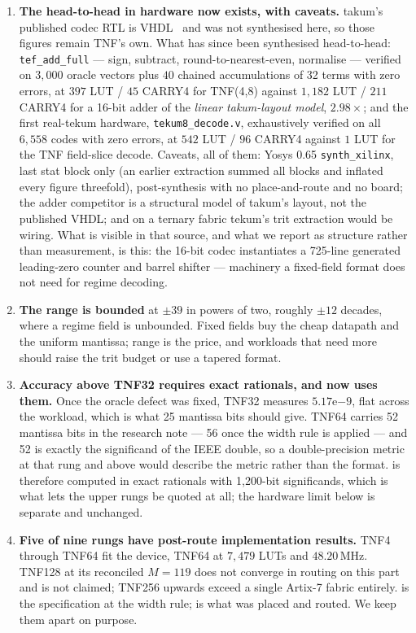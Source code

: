 \begin{enumerate}[leftmargin=*]
\item \textbf{The head-to-head in hardware now exists, with caveats.} takum's
published codec RTL is VHDL~\cite{takumrtl} and was not synthesised here, so
those figures remain TNF's own. What has since been synthesised head-to-head:
\texttt{tef\_add\_full} --- sign, subtract, round-to-nearest-even, normalise
--- verified on $3{,}000$ oracle vectors plus $40$ chained accumulations of 32
terms with zero errors, at $397$ LUT / $45$ CARRY4 for TNF(4,8) against
$1{,}182$ LUT / $211$ CARRY4 for a 16-bit adder of the \emph{linear
takum-layout model}, $2.98\times$; and the first real-tekum hardware,
\texttt{tekum8\_decode.v}, exhaustively verified on all $6{,}558$ codes with
zero errors, at $542$ LUT / $96$ CARRY4 against $1$ LUT for the TNF
field-slice decode. Caveats, all of them: Yosys 0.65 \texttt{synth\_xilinx},
last stat block only (an earlier extraction summed all blocks and inflated
every figure threefold), post-synthesis with no place-and-route and no board;
the adder competitor is a structural model of takum's layout, not the
published VHDL; and on a ternary fabric tekum's trit extraction would be
wiring. What is visible in that source, and what we report as structure
rather than measurement, is this: the 16-bit codec instantiates a 725-line
generated leading-zero counter and barrel shifter --- machinery a fixed-field
format does not need for regime decoding.

\item \textbf{The range is bounded} at $\pm39$ in powers of two, roughly $\pm12$
decades, where a regime field is unbounded. Fixed fields buy the cheap datapath
and the uniform mantissa; range is the price, and workloads that need more should
raise the trit budget or use a tapered format.

\item \textbf{Accuracy above TNF32 requires exact rationals, and now uses them.}
Once the oracle defect was fixed, TNF32 measures $5.17\mathrm{e}{-9}$, flat
across the workload, which is what 25 mantissa bits should give. TNF64 carries
52 mantissa bits in the research note --- 56 once the width rule is applied ---
and 52 is exactly the significand of the IEEE double, so a double-precision
metric at that rung and above would describe the metric rather than the format.
 is therefore computed in exact rationals with 1{,}200-bit
significands, which is what lets the upper rungs be quoted at all; the hardware
limit below is separate and unchanged.

\item \textbf{Five of nine rungs have post-route implementation results.} TNF4 through TNF64 fit
the device, TNF64 at $7{,}479$ LUTs and $48.20$\,MHz. TNF128 at its reconciled
$M = 119$ does not
converge in routing on this part and is not claimed; TNF256 upwards exceed a
single Artix-7 fabric entirely.  is the specification at the
width rule;  is what was placed and routed. We keep them
apart on purpose.


\end{enumerate}
